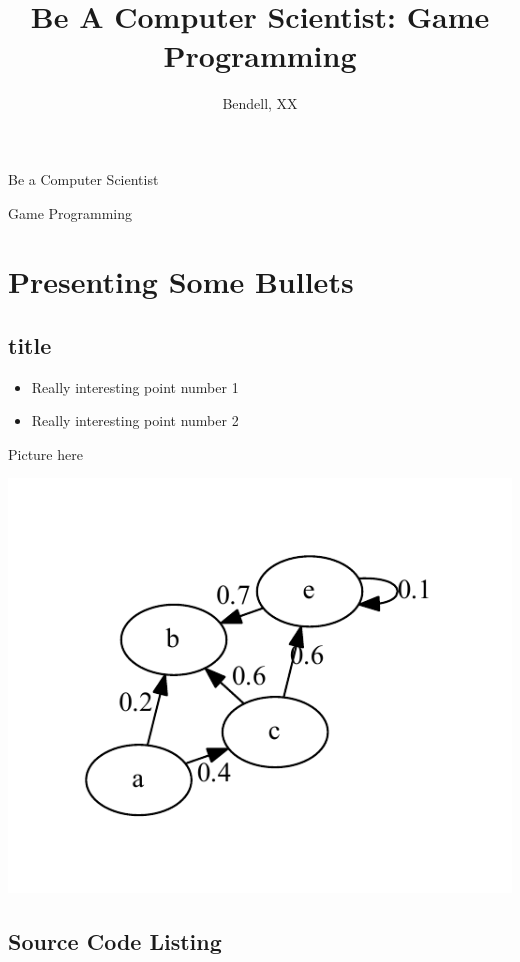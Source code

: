 \documentclass[
paper=128mm:96mm,
fontsize=11pt,
pagesize,
parskip=half-,
]{scrartcl}
\title{Be A Computer Scientist: Game Programming}
\author{Bendell, XX}
\date{}
\newcommand{\slide}[1]{#1 \clearpage}
\newcommand{\sectionslide}[1]{\slide{\hfill \vfill \section{#1}}}
\renewcommand\maketitle
{
	\vspace*{3ex}
	\begin{center}
		{\Huge Be a Computer Scientist \vspace*{.3em} \par}
		{\large Game Programming \par}
		\vspace*{2em}
	\end{center}
}
\begin{document}
	\slide
	{
		\maketitle	
	}
	
	\sectionslide{Presenting Some Bullets}

	\slide
	{
		\subsection{title}
		\begin{itemize}
			\item Really interesting point number 1
			\item Really interesting point number 2
		\end{itemize}
	}
	
	\slide
	{
		{\large Picture here}
		\begin{center}
			\includegraphics[width=.8\textwidth]{charts/test.pdf}
		\end{center}
	}
	
	\slide
	{
		\subsection{Source Code Listing}
		{
			\footnotesize
			\inputminted{java}{code-snippets/task.java}
		}
	}

	
\end{document}
